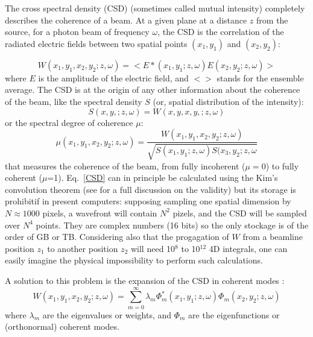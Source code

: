 \documentclass{iucr}              %
\begin{document}
The cross spectral density (CSD) (sometimes called mutual intensity) completely describes the coherence of a beam. 
At a given plane at a distance $z$ from the source, for a photon beam of frequency $\omega$, the CSD is the correlation of the radiated electric fields between two spatial points $(x_1,y_1)$ and $(x_2,y_2)$:

\begin{equation}\label{CSD}
W(x_1,y_1,x_2,y_2;z,\omega) = <E*(x_1,y_1; z,\omega) E(x_2,y_2;z,\omega)>
\end{equation}
where $E$ is the amplitude of the electric field, and $<>$ stands for the ensemble average. The CSD is at the origin of any other information about the coherence of the beam, like the spectral density $S$ (or, spatial distribution of the intensity): 
\begin{equation}\label{SD}
S(x,y,;z,\omega) = W(x,y,x,y,;z,\omega)
\end{equation}
or the spectral degree of coherence $\mu$:
\begin{equation}\label{SDC}
\mu(x_1,y_1,x_2,y_2;z,\omega) = \frac{W(x_1,y_1,x_2,y_2;z,\omega)}{\sqrt{ S(x_1,y_1;z,\omega) S(x_3,y_2;z,\omega}}
\end{equation}
that measures the coherence of the beam, from fully incoherent ($\mu=0$) to fully coherent ($\mu$=1). 
Eq.~\ref{CSD} can in principle be calculated using the Kim's convolution theorem \cite{kim1986} (see \cite{geloni2008} for a full discussion on the validity) but its storage is prohibitif in present computers: supposing sampling one spatial dimension by $N\approx1000$ pixels, a wavefront will contain $N^2$ pizels, and the CSD will be sampled over $N^4$ points. They are complex numbers (16 bits) so the only stockage is of the order of GB or TB. Considering also that the progagation of $W$ from a beamline position $z_1$ to another position $z_2$ will need 10$^8$ to 10$^{12}$ 4D integrals, one can easily imagine the physical impossibility to perform such calculations. 

A solution to this problem is the expansion of the CSD in coherent modes \cite{mandel_wolf}:  
\begin{equation}\label{decomposition}
 W(x_1,y_1,x_2,y_2;z,\omega) = \sum\limits_{m=0}^{\infty} \lambda_m \Phi_m^{*}(x_1,y_1;z,\omega) \Phi_m(x_2,y_2;z,\omega)
 \end{equation}
where $\lambda_m$ are the eigenvalues or weights, and $\Phi_m$ are the eigenfunctions or (orthonormal) coherent modes. 
\end{document}
